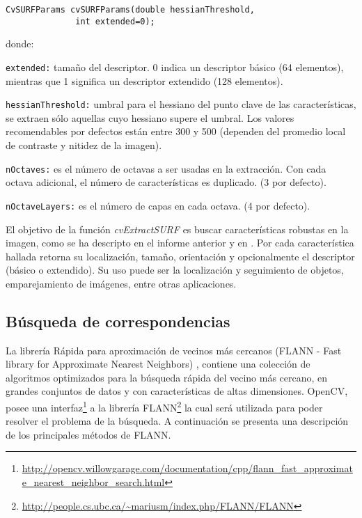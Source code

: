 \begin{itemize}
\begin{lstlisting}
CvSURFParams cvSURFParams(double hessianThreshold,
			  int extended=0);
\end{lstlisting}
donde:
\begin{description}
\item \texttt{extended:} tama\~no del descriptor. 0 indica un descriptor básico (64 elementos), mientras que 1 significa un descriptor extendido (128 elementos).
\item \texttt{hessianThreshold:} umbral para el hessiano del punto clave de las características, se extraen s\'olo aquellas cuyo hessiano supere el umbral.
Los valores recomendables por defectos est\'an entre 300 y 500 (dependen del promedio local de contraste y nitidez de la imagen). 
\item \texttt{nOctaves:} es el número de octavas a ser usadas en la extracción. Con cada octava adicional, el número de características es duplicado. (3 por defecto).
\item \texttt{nOctaveLayers:} es el número de capas en cada octava. (4 por defecto).
\end{description}
El objetivo de la función \emph{cvExtractSURF} es buscar características robustas en la imagen, como se ha descripto en el informe anterior y en \cite{Bay:2008:SRF}. Por cada característica hallada retorna su localización, tamaño, orientación y opcionalmente el descriptor (básico o extendido). Su uso puede ser la localización y seguimiento de objetos, emparejamiento de imágenes, entre otras aplicaciones.

\end{itemize}

\subsection{Búsqueda de correspondencias}
La librería Rápida para aproximación de vecinos más cercanos (FLANN - Fast library for Approximate Nearest Neighbors) \cite{muja_flann_2009}, contiene una colección de algoritmos optimizados para la búsqueda rápida del vecino más cercano, en grandes conjuntos de datos y con  características de altas dimensiones.
OpenCV, posee una interfaz\footnote{\url{http://opencv.willowgarage.com/documentation/cpp/flann_fast_approximate_nearest_neighbor_search.html}} a la librería FLANN\footnote{\url{http://people.cs.ubc.ca/~mariusm/index.php/FLANN/FLANN}} la cual ser\'a utilizada para poder resolver el problema de la búsqueda. 
A continuación se presenta una descripción de los principales métodos de FLANN.

